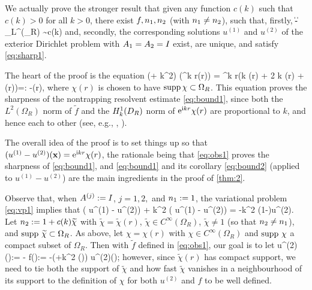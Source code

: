 We actually prove the stronger result that given any function $c(k)$ such that $c(k)>0$ for all $k>0$, there exist 
$f, n_{1}, n_{2}$ (with $n_{1}\not= n_{2}$), such that, firstly,
\beqs
\big\|\no-\nt\big\|_{L^\infty(\Omega_R)} \sim c(k)
\eeqs
and, secondly,
the corresponding solutions $u^{(1)}$ and $u^{(2)}$ of the exterior Dirichlet problem with $A_{1} = A_{2}= I$ exist, are unique, and satisfy \cref{eq:sharp1}. 

The heart of the proof is the equation
\beq\label{eq:obs1}
(\Delta + k^2) \big(\re^{\ri k r}\chi(r)\big) =  \re^{\ri k r}\left(\ri k  \chi(r) + 2 \ri k (r) + \Delta \chi(r)\right)=: -(r),
\eeq
where $\chi(r)$ is chosen to have $\operatorname{supp} \chi \subset \Omega_R$.
This equation proves the sharpness of the nontrapping resolvent estimate \cref{eq:bound1}, since both the $L^2(\Omega_R)$ norm of $\widetilde{f}$ and the $\HokDR$ norm of $\mathrm{e}^{\mathrm{i} kr}\chi(r)$ are proportional to $k$, and hence each to other (see, e.g., \cite[Lemma 3.10]{ChMo:08},  \cite[Lemma 4.12]{Sp:14}).

The overall idea of the proof is to set things up so that $(u^{(1)}-u^{(2)})(\mathbf{x}) = \mathrm{e}^{\mathrm{i} k r}\chi(r)$, the rationale being that \cref{eq:obs1} proves the sharpness of \cref{eq:bound1}, and \cref{eq:bound1} and its corollary \cref{eq:bound2} (applied to $u^{(1)}-u^{(2)}$) are the main ingredients in the proof of \cref{thm:2}.

Observe that, when $A^{(j)}:=I$, $j=1,2,$ and $n_{1}:=1$, the variational problem \cref{eq:vp1} implies that 
\beq\label{eq:obs2}
\Delta \big( u^{(1)} - u^{(2)}\big) + k^2 \big( u^{(1)} - u^{(2)}\big) = -k^2 \big(1-\nt\big)u^{(2)}.
\eeq
Let $n_{2}:= 1 + c(k)\widetilde{\chi}$ with $\widetilde{\chi}= \widetilde{\chi}(r)$, $\widetilde{\chi}\in C^{\infty}(\Omega_R)$, $\widetilde{\chi}\not = 1$ (so that $n_{2}\not = n_{1}$), and 
 $\operatorname{supp} \, \widetilde{\chi} \subset\Omega_R$. 
As above, let $\chi=\chi(r)$ with $\chi \in C^{\infty}(\Omega_R)$ and
$\operatorname{supp} \,\chi$ a compact subset of $\Omega_R$. Then with $\widetilde{f}$ defined in \cref{eq:obs1}, our goal is to let 
\beq\label{eq:obs3}
u^{(2)}(\bx):= - \quad\tand\quad  f(\bx):= -\big(\Delta +k^2 \nt(\bx)\big) u^{(2)}(\bx);
\eeq
however, since $\widetilde{\chi}(r)$ has compact support, we need to tie both the support of $\widetilde{\chi}$ and how fast $\widetilde{\chi}$ vanishes in a neighbourhood of its support to the definition of $\chi$ for both $u^{(2)}$ and $f$ to be well defined.

